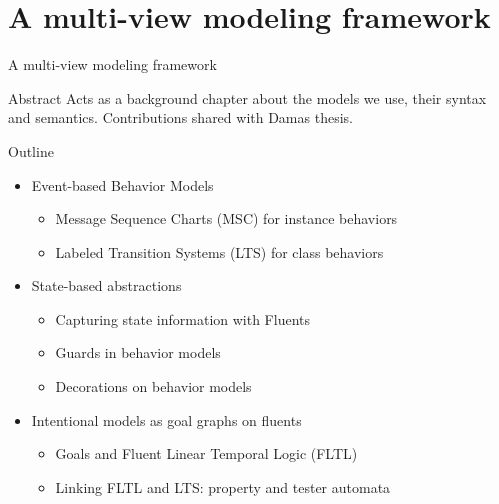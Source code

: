 \section{A multi-view modeling framework} 

\begin{frame}{A multi-view modeling framework} 
  \begin{block}{Abstract}
    Acts as a background chapter about the models we use, their syntax and semantics. 
    Contributions shared with Damas thesis.
  \end{block}
  \begin{block}{Outline}
    \begin{itemize}
      \item Event-based Behavior Models
        \begin{itemize}
          \item Message Sequence Charts (MSC) for instance behaviors 
          \item Labeled Transition Systems (LTS) for class behaviors
        \end{itemize}
      \item State-based abstractions
        \begin{itemize}
          \item Capturing state information with Fluents
          \item Guards in behavior models
          \item Decorations on behavior models
        \end{itemize}
      \item Intentional models as goal graphs on fluents
        \begin{itemize}
          \item Goals and Fluent Linear Temporal Logic (FLTL)
          \item Linking FLTL and LTS: property and tester automata
        \end{itemize}
    \end{itemize}
  \end{block}
\end{frame}

